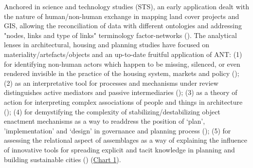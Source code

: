 \documentclass[11pt]{report}
\begin{document}
{{{{Anchored in science and technology studies (STS), an early application dealt with the nature of human/non-human exchange in mapping land cover projects and GIS, allowing the reconciliation of data with different ontologies and addressing "nodes, links and type of links" terminology factor-networks  (\href{Comber}{\citealt{comber_actornetwork_2003}}). The analytical lenses in architectural, housing and planning studies have focused on materiality/artefacts/objects and an up-to-date fruitful application of ANT: 
(1) for identifying non-human actors which happen to be missing, silenced, or even rendered invisible in the practice of the housing system, markets and policy (\href{Gabriel}{\citealt{gabriel_post-social_2008}}); (2) as an interpretative tool for processes and mechanisms under review distinguishes active mediators and passive intermediaries (\href{Cowan}{\citealt{cowan_nominations:_2009}}); (3) as a theory of action for interpreting complex associations of people and things in architecture (\href{Fallan}{\citealt{fallan_architecture_2011}}); (4) for demystifying the complexity of stabilizing/destabilizing object enactment mechanisms as a way to readdress the position of ‘plan’, ’implementation’ and ‘design’ in governance and planning process (\href{Van_Assche}{\citealt{van_assche_co-evolutions_2013}}); (5) for assessing the relational aspect of assemblages as a way of explaining the influence of innovative tools for spreading explicit and tacit knowledge in planning and building sustainable cities (\href{Georg}{\citealt{georg_building_2015}}) (\href{Table 1}{Chart 1}).
\\

}}}}
\end{document}
